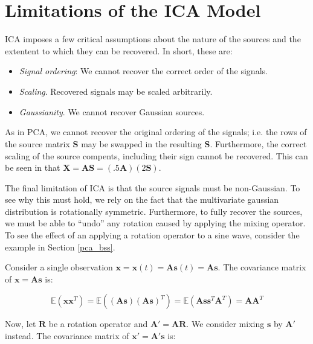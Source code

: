 \documentclass[11pt, oneside, a4paper]{report}
\begin{document}
\section{Limitations of the ICA Model}\label{ICA_restrictions}

ICA imposes a few critical assumptions about the nature of the sources
and the extentent to which they can be recovered. In short, these are:


\begin{itemize}
  \item \emph{Signal ordering}: We cannot recover the correct order of
    the signals.
  \item \emph{Scaling}. Recovered signals may be scaled arbitrarily.
  \item \emph{Gaussianity}. We cannot recover Gaussian sources.
\end{itemize}


As in PCA, we cannot
recover the original ordering of the signals; i.e. the rows of the
source matrix $\boldsymbol{S}$ may be swapped in the resulting
$\hat{\boldsymbol{S}}$. Furthermore, the correct scaling of the source
compents, including their sign cannot be recovered. This can be seen
in that $\boldsymbol{X} = \boldsymbol{A}\boldsymbol{S} = (.5
\boldsymbol{A})(2 \boldsymbol{S})$.

The final limitation of ICA is that the source signals must be
non-Gaussian. To see why this must hold, we rely on the fact that the
multivariate gaussian distribution is rotationally symmetric. Furthermore,
to fully recover the sources, we must be able to ``undo'' any rotation
caused by applying the mixing operator. To see the effect of an
applying a rotation operator to a sine wave, consider the example in
Section \ref{pca_bss}.

Consider a single observation
$\boldsymbol{x} = \boldsymbol{x}(t) =\boldsymbol{A}\boldsymbol{s}(t) =
\boldsymbol{A}\boldsymbol{s}$. The covariance matrix of
$\boldsymbol{x} = \boldsymbol{A}\boldsymbol{s}$ is:


    \begin{equation}
      \mathbb{E}(\boldsymbol{x}\boldsymbol{x}^T) 
      = \mathbb{E}((\boldsymbol{A}\boldsymbol{s})(\boldsymbol{A}\boldsymbol{s})^T) = \mathbb{E}(\boldsymbol{A}\boldsymbol{s}\boldsymbol{s}^T\boldsymbol{A}^T)=\boldsymbol{A}\boldsymbol{A}^T      
    \end{equation}

Now, let $\boldsymbol{R}$ be a rotation operator and $\boldsymbol{A}'
= \boldsymbol{AR}$. We consider mixing $\boldsymbol{s}$ by
$\boldsymbol{A}'$ instead. The covariance matrix of  
$\boldsymbol{x}' = \boldsymbol{A}'\boldsymbol{s}$ is:
\end{document}
